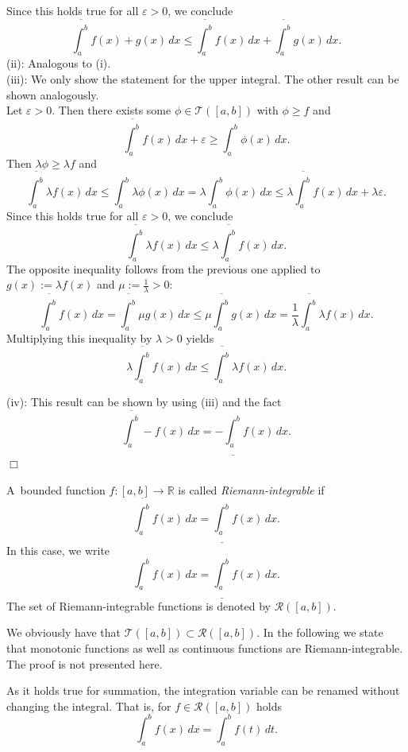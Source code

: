 Since this holds true for all $\varepsilon>0$, we conclude
\[\overline{\int_a^b}f(x)+g(x)\, dx\leq\overline{\int_a^b}f(x)\, dx+\overline{\int_a^b}g(x)\, dx.\]
(ii): Analogous to (i).\\
(iii):  We only show the statement for the upper integral. The other result can be shown analogously.\\
Let $\varepsilon>0$. Then there exists some $\phi\in\mathcal{T}([a,b])$ with $\phi\geq f$ and
\[\overline{\int_a^b}f(x)\, dx+\varepsilon\geq{\int_a^b}\phi(x)\, dx.\]
Then $\lambda \phi\geq\lambda f$ and
\[\overline{\int_a^b} \lambda f(x)\, dx\leq{\int_a^b}\lambda\phi(x)\, dx=\lambda{\int_a^b}\phi(x)\, dx\leq \lambda\overline{\int_a^b} f(x)\, dx+\lambda\varepsilon.\]
Since this holds true for all $\varepsilon>0$, we conclude
\[\overline{\int_a^b}\lambda f(x)\, dx\leq\lambda \overline{\int_a^b}f(x)\, dx.\]
The opposite inequality follows from the previous one applied to $g(x):=\lambda f(x)$ and $\mu:=\frac{1}{\lambda}>0$:
\[\overline{\int_a^b} f(x)\, dx =  \overline{\int_a^b} \mu g(x)\, dx \leq \mu \overline{\int_a^b}g(x)\, dx = \frac{1}{\lambda} \overline{\int_a^b}\lambda f(x)\, dx.\]
Multiplying this inequality by $\lambda>0$ yields
\[\lambda \overline{\int_a^b} f(x)\, dx  \leq \overline{\int_a^b}\lambda f(x)\, dx.\]

(iv): This result can be shown by using (iii) and the fact
\[\overline{\int_a^b}-f(x)\, dx=-\underline{\int_a^b}f(x)\, dx.\]
\hfill$\Box$

\begin{Definition}{}
A~bounded function $f:[a,b]\to\mathbb{R}$ is called \emph{Riemann-integrable} if
\[\overline{\int_a^b}f(x)\, dx=\underline{\int_a^b}f(x)\, dx.\]
In this case, we write
\[{\int_a^b}f(x)\, dx=\underline{\int_a^b}f(x)\, dx.\]
The set of Riemann-integrable functions is denoted by $\mathcal{R}([a,b])$.
\end{Definition}


We obviously have that $\mathcal{T}([a,b])\subset\mathcal{R}([a,b])$. In the following we state that monotonic functions as well as continuous functions are Riemann-integrable. The proof is not presented here.

\begin{Remark}{}
As it holds true for summation, the integration variable can be renamed without changing the integral. That is, for $f\in\mathcal{R}([a,b])$ holds
\[{\int_a^b}f(x)\, dx={\int_a^b}f(t)\, dt.\]
\end{Remark}


